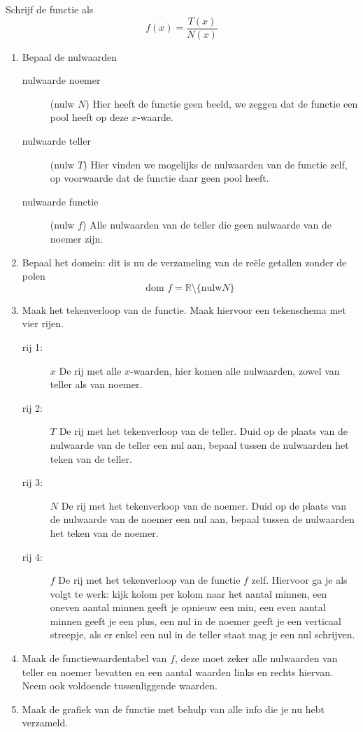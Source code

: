 \documentclass[12pt]{article}
\begin{document}
Schrijf de functie als
$$f(x)=\dfrac{T(x)}{N(x)}$$
\begin{enumerate}
\singlespacing
  \item Bepaal de nulwaarden
  \begin{description}
    \item[nulwaarde noemer] (nulw $N$) Hier heeft de functie geen beeld, we zeggen dat de functie een pool heeft op deze $x$-waarde.
    \item[nulwaarde teller] (nulw $T$) Hier vinden we mogelijks de nulwaarden van de functie zelf, op voorwaarde dat de functie daar geen pool heeft.
    \item[nulwaarde functie] (nulw $f$) Alle nulwaarden van de teller die geen nulwaarde van de noemer zijn.
  \end{description}
  \item Bepaal het domein: dit is nu de verzameling van de reële getallen zonder de polen
  $$\mbox{dom }f = \mathbb{R}\setminus \{\mbox{nulw} N\}$$
  \item Maak het tekenverloop van de functie. Maak hiervoor een tekenschema met vier rijen.
  \begin{description}
    \item[rij 1:] $x$ De rij met alle $x$-waarden, hier komen alle nulwaarden, zowel van teller als van noemer.
    \item[rij 2:] $T$ De rij met het tekenverloop van de teller. Duid op de plaats van de nulwaarde van de teller een nul aan, bepaal tussen de nulwaarden het teken van de teller.
    \item[rij 3:] $N$ De rij met het tekenverloop van de noemer. Duid op de plaats van de nulwaarde van de noemer een nul aan, bepaal tussen de nulwaarden het teken van de noemer.
    \item[rij 4:] $f$ De rij met het tekenverloop van de functie $f$ zelf. Hiervoor ga je als volgt te werk: kijk kolom per kolom naar het aantal minnen, een oneven aantal minnen geeft je opnieuw een min, een even aantal minnen geeft je een plus, een nul in de noemer geeft je een verticaal streepje, als er enkel een nul in de teller staat mag je een nul schrijven.
  \end{description}
  \item Maak de functiewaardentabel van $f$, deze moet zeker alle nulwaarden van teller en noemer bevatten en een aantal waarden links en rechts hiervan. Neem ook voldoende tussenliggende waarden.
  \item Maak de grafiek van de functie met behulp van alle info die je nu hebt verzameld.

\end{enumerate}
\end{document}
